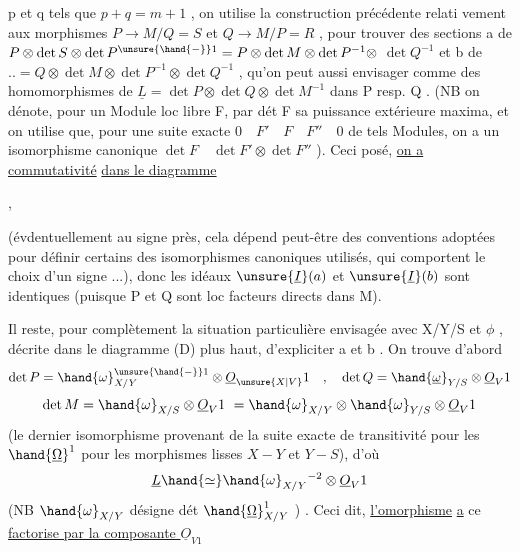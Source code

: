 
p et q tels que $p+q=m+1$ , on utilise la construction précédente relati
vement aux morphismes $P\longrightarrow M/Q = S$ et $Q\longrightarrow M/P = R$ , pour trouver
des sections  a de $P \otimes \det S \otimes \det P^{\unsure{\hand{-}}1} = P \otimes \det M \otimes \det P^{-1} \otimes$
$\det Q^{-1}$ et b de $.. = Q \otimes \det M \otimes \det P^{-1} \otimes \det Q^{-1}$ , qu'on peut
aussi envisager comme des homomorphismes de $\underline{L} = \det P \otimes \det Q \otimes \det M^{-1}$
dans P resp. Q . (NB on dénote, pour un Module loc libre F, par dét F
sa puissance extérieure maxima, et on utilise que, pour une suite
exacte $0 \quad F' \quad F \quad F'' \quad 0$ de tels Modules, on a un isomorphisme
canonique $\det F \quad \det F' \otimes \det F''$ ). Ceci posé, \uline{on a commutativité}
\uline{dans le diagramme}

,

(évdentuellement au signe près, cela dépend peut-être des conventions
adoptées pour définir certains des isomorphismes canoniques utilisés,
qui comportent le choix d'un signe ...), donc les idéaux $\unsure{\underline{I}}(a)$ et $\unsure{\underline{I}}(b)$
sont identiques (puisque P et Q sont loc facteurs directs dans M). 

Il reste, pour  complètement la situation particulière
envisagée avec X/Y/S et $\phi$ , décrite dans le diagramme (D) plus haut, 
d'expliciter a et b . On trouve d'abord
\[ \det P = \hand{\omega}_{X/Y}^{\unsure{\hand{-}}1} \otimes \underline{O}_{\unsure{X|V}}1 \quad , \quad \det Q = \hand{\underline{\omega}}_{Y/S} \otimes \underline{O}_{V}1 \]
\[ \det M = \hand{\omega}_{X/S} \otimes \underline{O}_{V}1 \ = \hand{\omega}_{X/Y} \otimes \hand{\omega}_{Y/S} \otimes \underline{O}_{V}1 \]
(le dernier isomorphisme provenant de la suite exacte de transitivité
pour les $\hand{\underline{\Omega}}^1$ pour les morphismes lisses $X-Y$ et $Y-S$), d'où
\[ \underline{L} \hand{\simeq} \hand{\omega}_{X/Y}{}^{-2} \otimes \underline{O}_{V}1 \]
(NB $\hand{\omega}_{X/Y}$ désigne  dét $\hand{\underline{\Omega}}^1_{X/Y}$ ) . Ceci dit, \uline{l'omorphisme} \uline{a} ce \hand{---}
\uline{factorise par la composante $\underline{O}_{V1}$}

